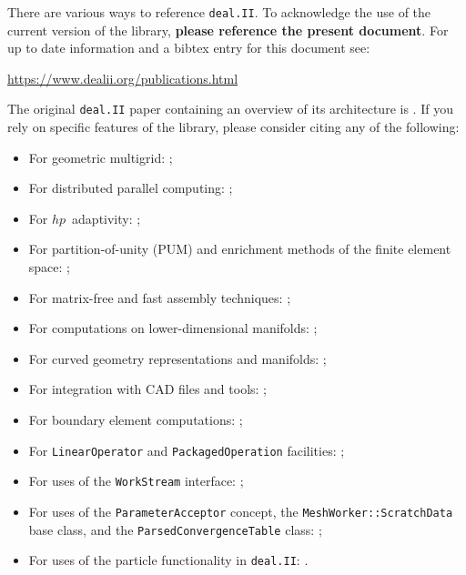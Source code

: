 \documentclass{ansarticle-preprint}
\newcommand{\specialword}[1]{\texttt{#1}}
\newcommand{\dealii}{{\specialword{deal.II}}\xspace}
\begin{document}
There are various ways to reference \dealii. To acknowledge the use of
the current version of the library, \textbf{please reference the present
document}. For up to date information and a bibtex entry for this document
see:
\begin{center}
 \url{https://www.dealii.org/publications.html}
\end{center}

The original \texttt{\dealii} paper containing an overview of its
architecture is \cite{BangerthHartmannKanschat2007}. If you rely on
specific features of the library, please consider citing any of the
following:
\begin{itemize}
 \item For geometric multigrid: \cite{Kanschat2004,JanssenKanschat2011,ClevengerHeisterKanschatKronbichler2019};
 \item For distributed parallel computing: \cite{BangerthBursteddeHeisterKronbichler11};
 \item For $hp$~adaptivity: \cite{BangerthKayserHerold2007};
  \item For partition-of-unity (PUM) and enrichment methods of the
    finite element space: \cite{Davydov2016};
 \item For matrix-free and fast assembly techniques:
   \cite{KronbichlerKormann2012,KronbichlerKormann2019};
 \item For computations on lower-dimensional manifolds:
   \cite{DeSimoneHeltaiManigrasso2009};
 \item For curved geometry representations and manifolds:
   \cite{HeltaiBangerthKronbichlerMola2019};
 \item For integration with CAD files and tools:
   \cite{HeltaiMola2015};
 \item For boundary element computations:
   \cite{GiulianiMolaHeltai-2018-a};
 \item For \texttt{LinearOperator} and \texttt{PackagedOperation} facilities:
   \cite{MaierBardelloniHeltai-2016-a,MaierBardelloniHeltai-2016-b};
 \item For uses of the \texttt{WorkStream} interface:
   \cite{TKB16};
   \item For uses of the \texttt{ParameterAcceptor} concept, the
     \texttt{MeshWorker::ScratchData} base class, and the
     \texttt{ParsedConvergenceTable} class:
     \cite{SartoriGiulianiBardelloni-2018-a};
   \item For uses of the particle functionality in \dealii{}: \cite{GLHPB18}.
\end{itemize}
\end{document}
